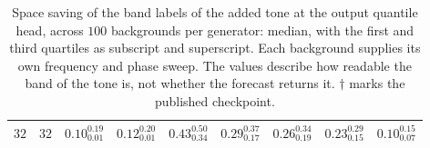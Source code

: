 \begin{table}[!tbp]
\begin{tabular}{@{}ccrrrrrrr@{}}
        $32$ & $32$ & $0.10_{0.01}^{0.19}$ & $0.12_{0.01}^{0.20}$ & $0.43_{0.34}^{0.50}$ & $0.29_{0.17}^{0.37}$ & $0.26_{0.19}^{0.34}$ & $0.23_{0.15}^{0.29}$ & $0.10_{0.07}^{0.15}$ \\
        \bottomrule
    \end{tabular}
    \caption{Space saving of the band labels of the added tone at the output quantile head, across $100$ backgrounds per generator: median, with the first and third quartiles as subscript and superscript. Each background supplies its own frequency and phase sweep. The values describe how readable the band of the tone is, not whether the forecast returns it. $\dagger$ marks the published checkpoint.}
    \label{tab:probingCompression}
\end{table}
